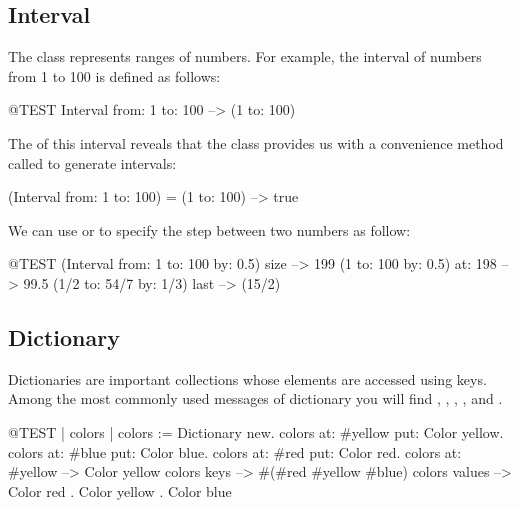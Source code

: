 \documentclass[a4paper,10pt,twoside]{book}
\begin{document}

\subsection{Interval}
The class  represents ranges of numbers.
For example, the interval of numbers from 1 to 100 is defined as follows:
\begin{code}{@TEST}
Interval from: 1 to: 100 --> (1 to: 100)
\end{code}

\noindent
The  of this interval reveals that the class  provides us with a convenience method called  to generate intervals:

\begin{code}{}
(Interval from: 1 to: 100) = (1 to: 100) --> true
\end{code}

We can use  or  to specify the step between two numbers as follow:

\begin{code}{@TEST}
(Interval from: 1 to: 100 by: 0.5) size --> 199
(1 to: 100 by: 0.5) at: 198 --> 99.5
(1/2 to: 54/7 by: 1/3) last --> (15/2)
\end{code}

\subsection{Dictionary}
Dictionaries are important collections whose elements are accessed using keys. 
Among the most commonly used messages of dictionary you will find , , , , and .

\begin{code}{@TEST | colors |}
colors := Dictionary new.
colors at: #yellow put: Color yellow.
colors at: #blue put: Color blue.
colors at: #red put: Color red.
colors at: #yellow --> Color yellow
colors keys          --> #(#red #yellow #blue)
colors values       -->  {Color red . Color yellow . Color blue}
\end{code}
\end{document}
